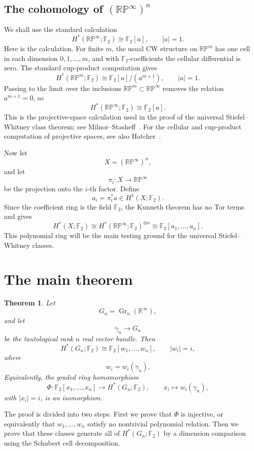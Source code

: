 \documentclass[11pt]{article}
\newcommand{\F}{\mathbb F}
\newcommand{\R}{\mathbb R}
\newcommand{\RP}{\mathbb{RP}}
\newcommand{\Gr}{\operatorname{Gr}}
\theoremstyle{plain}
\newtheorem{theorem}{Theorem}[section]
\theoremstyle{definition}
\numberwithin{equation}{section}
\begin{document}
\subsection{The cohomology of $(\RP^\infty)^n$}

We shall use the standard calculation
\[
  H^*(\RP^\infty;\F_2)
  \cong
  \F_2[a],
  \qquad |a|=1.
\]
Here is the calculation.  For finite $m$, the usual CW structure on $\RP^m$ has one cell in each dimension $0,1,\ldots,m$, and with $\F_2$-coefficients the cellular differential is zero.  The standard cup-product computation gives
\[
  H^*(\RP^m;\F_2)
  \cong
  \F_2[a]/(a^{m+1}),
  \qquad |a|=1.
\]
Passing to the limit over the inclusions $\RP^m\subset\RP^\infty$ removes the relation $a^{m+1}=0$, so
\[
  H^*(\RP^\infty;\F_2)
  \cong
  \F_2[a].
\]
This is the projective-space calculation used in the proof of the universal Stiefel--Whitney class theorem; see Milnor--Stasheff~\cite[Section 7]{MS74}.  For the cellular and cup-product computation of projective spaces, see also Hatcher~\cite[Section 3.2]{Hat02}.

Now let
\[
  X=(\RP^\infty)^n,
\]
and let
\[
  \pi_i:X\to\RP^\infty
\]
be the projection onto the $i$-th factor.  Define
\[
  a_i=\pi_i^*a\in H^1(X;\F_2).
\]
Since the coefficient ring is the field $\F_2$, the Kunneth theorem has no Tor terms and gives
\[
  H^*(X;\F_2)
  \cong
  H^*(\RP^\infty;\F_2)^{\otimes n}
  \cong
  \F_2[a_1,\ldots,a_n].
\]
This polynomial ring will be the main testing ground for the universal Stiefel--Whitney classes.

\section{The main theorem}

\begin{theorem}\label{thm:main}
Let
\[
  G_n=\Gr_n(\R^\infty),
\]
and let
\[
  \gamma_n\to G_n
\]
be the tautological rank $n$ real vector bundle.  Then
\[
  H^*(G_n;\F_2)
  \cong
  \F_2[w_1,\ldots,w_n],
  \qquad |w_i|=i,
\]
where
\[
  w_i=w_i(\gamma_n).
\]
Equivalently, the graded ring homomorphism
\[
  \Phi:\F_2[x_1,\ldots,x_n]
  \longrightarrow
  H^*(G_n;\F_2),
  \qquad
  x_i\longmapsto w_i(\gamma_n),
\]
with $|x_i|=i$, is an isomorphism.
\end{theorem}

The proof is divided into two steps.  First we prove that $\Phi$ is injective, or equivalently that $w_1,\ldots,w_n$ satisfy no nontrivial polynomial relation.  Then we prove that these classes generate all of $H^*(G_n;\F_2)$ by a dimension comparison using the Schubert cell decomposition.
\end{document}

